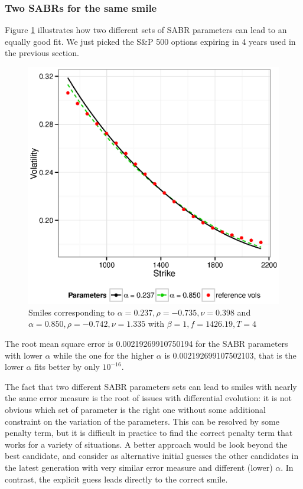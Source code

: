 \documentclass[]{rAMF2e}
\begin{document}
\subsubsection{Two SABRs for the same smile}
Figure \ref{fig:two_sabr_1_smile} illustrates how two different sets of SABR parameters can lead to an equally good fit. We just picked the S\&P 500 options expiring in 4 years used in the previous section.
\begin{figure}[h]
  \caption{\label{fig:two_sabr_1_smile}Smiles corresponding to $\alpha= 0.237, \rho= -0.735, \nu= 0.398$ and $\alpha= 0.850, \rho= -0.742, \nu= 1.335$ with $\beta=1, f=1426.19, T=4$}
\begin{center}
 \includegraphics[width=13cm]{two_sabr_1_smile.eps}
\end{center}
\end{figure}
 The root mean square error is  0.00219269910750194 for the SABR parameters with lower $\alpha$ while the one for the higher $\alpha$ is 0.002192699107502103, that is the lower $\alpha$ fits better by only $10^{-16}$.
 
The fact that two different SABR parameters sets can lead to smiles with nearly the same error measure is the root of issues with differential evolution: it is not obvious which set of parameter is the right one without some additional constraint on the variation of the parameters. This can be resolved by some penalty term, but it is difficult in practice to find the correct penalty term that works for a variety of situations. A better approach would be look beyond the best candidate, and consider as alternative initial guesses the other candidates in the latest generation with very similar error measure and different (lower) $\alpha$. In contrast, the explicit guess leads directly to the correct smile.
\end{document}
